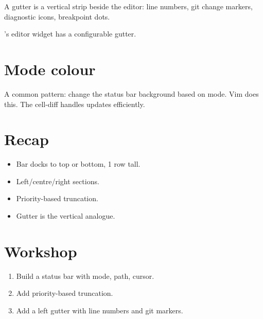 A gutter is a vertical strip beside the editor: line
numbers, git change markers, diagnostic icons, breakpoint
dots.

\maya{}'s editor widget has a configurable gutter.

\section{Mode colour}

A common pattern: change the status bar background based on
mode. Vim does this. The cell-diff handles updates
efficiently.

\section{Recap}

\begin{recap}
\begin{itemize}[leftmargin=*]
  \item Bar docks to top or bottom, 1 row tall.
  \item Left/centre/right sections.
  \item Priority-based truncation.
  \item Gutter is the vertical analogue.
\end{itemize}
\end{recap}

\section*{Workshop}

\begin{enumerate}[leftmargin=*]
  \item Build a status bar with mode, path, cursor.
  \item Add priority-based truncation.
  \item Add a left gutter with line numbers and git
    markers.
\end{enumerate}
